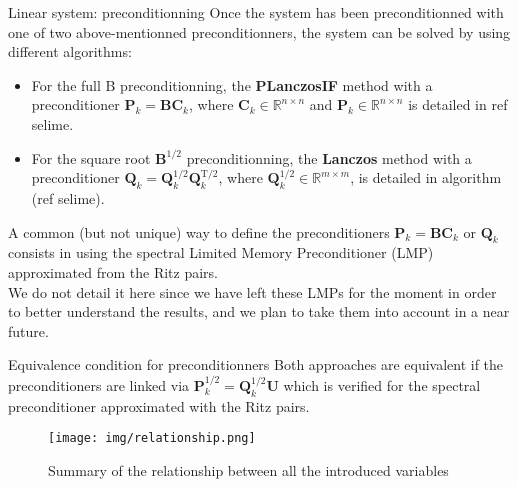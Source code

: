 \documentclass[8pt]{beamer}
\begin{document}
\begin{frame}{Linear system: preconditionning}
Once the system has been preconditionned with one of two above-mentionned preconditionners, the system can be solved by using different algorithms:\\
\vspace{+0.3cm}
\begin{itemize}
 \item For the full B preconditionning, the \textbf{PLanczosIF} method with a preconditioner $\mathbf{P}_k = \mathbf{B}\mathbf{C}_k$, where $\mathbf{C}_k \in \mathbb{R}^{n \times n}$ and $\mathbf{P}_k \in \mathbb{R}^{n \times n}$ is detailed in ref selime.
 \vspace{+0.3cm}
 \item For the square root $\mathbf{B}^{1/2}$ preconditionning, the \textbf{Lanczos} method with a preconditioner $\mathbf{Q}_k = \mathbf{Q}_k^{1/2} \mathbf{Q}_k^{\mathrm{T}/2}$, where $\mathbf{Q}_k^{1/2} \in \mathbb{R}^{m \times m}$, is detailed in algorithm (ref selime).\\
 \end{itemize}
 \vspace{+0.3cm}
A common (but not unique) way to define the preconditioners $\mathbf{P}_k = \mathbf{B}\mathbf{C}_k$ or $\mathbf{Q}_k$ consists in using the spectral Limited Memory Preconditioner (LMP) approximated from the Ritz pairs.\\
We do not detail it here since we have left these LMPs for the moment in order to better understand the results, and we plan to take them into account in a near future.
\end{frame}

\begin{frame}{Equivalence condition for preconditionners}
Both approaches are equivalent if the preconditioners are linked via $\mathbf{P}^{1/2}_k = \mathbf{Q}^{1/2}_k \mathbf{U}$ \small{which is verified for the spectral preconditioner approximated with the Ritz pairs.}
\begin{center}
 \begin{figure}
 \label{relation}
  \texttt{[image: img/relationship.png]}
  \caption{Summary of the relationship between all the introduced variables}
 \end{figure}
\end{center}
\end{frame}
\end{document}
